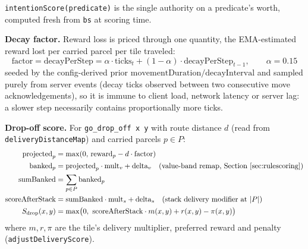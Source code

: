 \documentclass[11pt,a4paper]{article}
\renewcommand{\paragraph}[1]{\par\smallskip\noindent\textbf{#1}}
\begin{document}
\texttt{intentionScore(predicate)} is the single authority on a predicate's worth, computed fresh
from \texttt{bs} at scoring time.

\paragraph{Decay factor.} Reward loss is priced through one quantity, the EMA-estimated reward
lost per carried parcel per tile traveled:
\begin{equation}
\text{factor} = \text{decayPerStep} =
\alpha \cdot \text{ticks}_t + (1-\alpha)\cdot \text{decayPerStep}_{t-1},
\qquad \alpha = 0.15
\label{eq:decay-ema}
\end{equation}
seeded by the config-derived prior $\text{movementDuration} / \text{decayInterval}$ and sampled
purely from server events (decay ticks observed between two consecutive move
acknowledgements), so it is immune to client load, network latency or server lag: a slower step
necessarily contains proportionally more ticks.

\paragraph{Drop-off score.} For \texttt{go\_drop\_off x y} with route distance $d$ (read from
\texttt{deliveryDistanceMap}) and carried parcels $p\in P$:
\begin{align}
\text{projected}_p &= \max(0,\, \text{reward}_p - d\cdot\text{factor}) \\
\text{banked}_p &= \text{projected}_p \cdot \text{mult}_v + \text{delta}_v
  \quad\text{(value-band remap, Section~\ref{sec:rulescoring})} \\
\text{sumBanked} &= \sum_{p\in P} \text{banked}_p \\
\text{scoreAfterStack} &= \text{sumBanked}\cdot\text{mult}_s + \text{delta}_s
  \quad\text{(stack delivery modifier at } |P| \text{)} \\
S_{\text{drop}}(x,y) &= \max\!\big(0,\ \text{scoreAfterStack}\cdot m(x,y) + r(x,y) - \pi(x,y)\big)
\label{eq:drop-score}
\end{align}
where $m,r,\pi$ are the tile's delivery multiplier, preferred reward and penalty
(\texttt{adjustDeliveryScore}).
\end{document}
